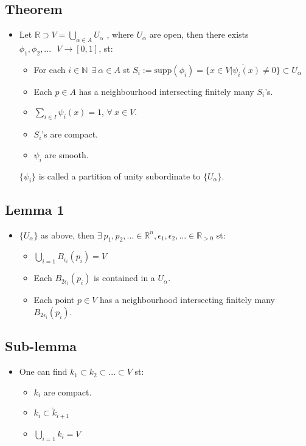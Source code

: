 \documentclass[11pt]{article}
\DeclareRobustCommand{\RR}{\mathbb{R}}
\numberwithin{equation}{section}
\begin{document}
\subsection{Theorem}
\begin{itemize}
    \item Let $\RR \supset V = \bigcup_{\alpha \in A}U_{\alpha}$ ,  where $U_{\alpha} $ are open, then there exists $\phi_1,\phi_2,...~~~V \rightarrow [0,1]$, st: 
\begin{itemize}
    \item For each $i \in \mathbb{N}~~ \exists ~ \alpha \in A $ st $S_i := \text{supp}(\phi_i) =  \overline{\{x\in V|\psi_i(x)\neq 0\}} \subset U_{\alpha}$  
    \item Each $p\in A$ has a neighbourhood intersecting finitely many $S_i$'s. 
    \item $\sum_{i\in I }\psi_i(x)=1$, $\forall~x\in V$.
    \item $S_i$'s are compact.
    \item $\psi_i$ are smooth.

\end{itemize}
$\{\psi_i\}$ is called a partition of unity subordinate to $\{U_{\alpha}\}$. 
\end{itemize}
\subsection{Lemma 1}
\begin{itemize}
    \item  $\{U_{\alpha}\}$ as above,  then $\exists~p_1,p_2,...\in \RR^n, \epsilon_1,\epsilon_2,...\in \RR_{>0}$ st: 
\begin{itemize}
    \item $\bigcup_{i=1}B_{\epsilon_i}(p_i) = V$
    \item Each $B_{2\epsilon_i}(p_i)$ is contained in a $U_{\alpha}$. 
    \item Each point $p \in V$ has a neighbourhood intersecting finitely many $B_{2\epsilon_i}(p_i)$.
\end{itemize}
\end{itemize}
\subsection{Sub-lemma}
\begin{itemize}
    \item One can find $k_1\subset k_2\subset ...\subset V$ st:
\begin{itemize}
    \item $k_i$ are compact.
    \item $k_i \subset \mathring k_{i+1}$ 
    \item $\bigcup_{i=1} k_i = V$
\end{itemize}
\end{itemize}
\end{document}
